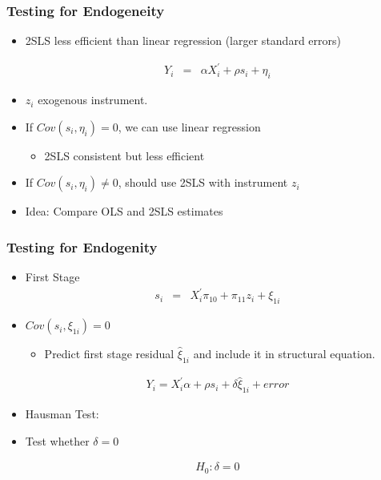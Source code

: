 \documentclass[pdftex]{beamer}
\begin{document}
\begin{frame}
\frametitle{Testing for Endogeneity}
\begin{itemize}
\item 2SLS less efficient than linear regression (larger standard errors)

\begin{eqnarray*}
   Y_{i} &=& \alpha X_{i}^{'}+ \rho s_{i}+ \eta_{i}
\end{eqnarray*}

\item $z_{i}$ exogenous instrument.
\item If $Cov\left(s_{i}, \eta_{i}\right)=0$, we can use linear regression
    \begin {itemize}
    \item 2SLS consistent but less efficient
  \end {itemize}
\item If $Cov\left(s_{i}, \eta_{i}\right)\neq0$, should use 2SLS with instrument $z_{i}$

\item Idea: Compare OLS and 2SLS estimates


\end{itemize}

\end{frame}




\begin{frame}
\frametitle{Testing for Endogenity}
\begin{itemize}
      \item First Stage
       \begin{eqnarray*}
           s_{i} &=& X_{i}^{'}\pi_{10}+ \pi_{11}z_{i}+ \xi_{1i}
      \end{eqnarray*}

      \item $Cov\left(s_{i}, \xi_{1i}\right)=0$


     \begin {itemize}
     \item Predict first stage residual $\hat{\xi}_{1i}$ and include it in structural equation.
    \end {itemize}

\begin{eqnarray*}
           Y_{i}= X_{i}^{'}\alpha+ \rho s_{i}+ \delta\hat{\xi}_{1i}+ error
      \end{eqnarray*}
\item Hausman Test:
     \item Test whether $\delta=0$

\begin{eqnarray*}
H_{0}: \delta=0
\end{eqnarray*}



\end{itemize}

\end{frame}
\end{document}
